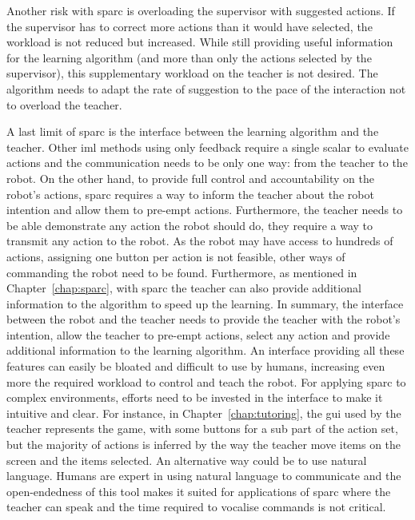 Another risk with \gls{sparc} is overloading the supervisor with suggested actions. If the supervisor has to correct more actions than it would have selected, the workload is not reduced but increased. While still providing useful information for the learning algorithm (and more than only the actions selected by the supervisor), this supplementary workload on the teacher is not desired. The algorithm needs to adapt the rate of suggestion to the pace of the interaction not to overload the teacher.

A last limit of \gls{sparc} is the interface between the learning algorithm and the teacher. Other \gls{iml} methods using only feedback require a single scalar to evaluate actions and the communication needs to be only one way: from the teacher to the robot. On the other hand, to provide full control and accountability on the robot's actions, \gls{sparc} requires a way to inform the teacher about the robot intention and allow them to pre-empt actions. Furthermore, the teacher needs to be able demonstrate any action the robot should do, they require a way to transmit any action to the robot. As the robot may have access to hundreds of actions, assigning one button per action is not feasible, other ways of commanding the robot need to be found. Furthermore, as mentioned in Chapter~\ref{chap:sparc}, with \gls{sparc} the teacher can also provide additional information to the algorithm to speed up the learning. In summary, the interface between the robot and the teacher needs to provide the teacher with the robot's intention, allow the teacher to pre-empt actions, select any action and provide additional information to the learning algorithm. An interface providing all these features can easily be bloated and difficult to use by humans, increasing even more the required workload to control and teach the robot. For applying \gls{sparc} to complex environments, efforts need to be invested in the interface to make it intuitive and clear. For instance, in Chapter~\ref{chap:tutoring}, the \gls{gui} used by the teacher represents the game, with some buttons for a sub part of the action set, but the majority of actions is inferred by the way the teacher move items on the screen and the items selected. An alternative way could be to use natural language. Humans are expert in using natural language to communicate and the open-endedness of this tool makes it suited for applications of \gls{sparc} where the teacher can speak and the time required to vocalise commands is not critical.


